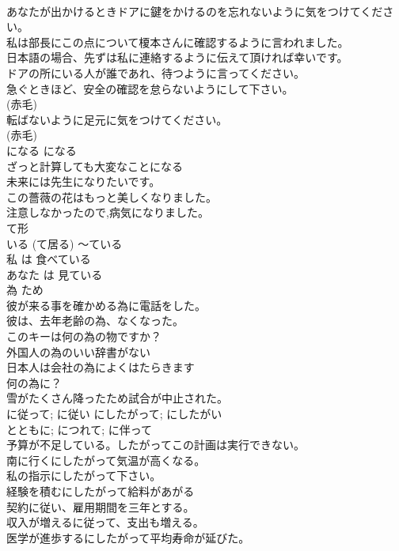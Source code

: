 \documentclass[8pt]{extreport}
\begin{document}
\begin{CJK}{UTF8}{min}
\\	あなたが出かけるときドアに鍵をかけるのを忘れないように気をつけてください。  
\\	私は部長にこの点について榎本さんに確認するように言われました。  
\\	日本語の場合、先ずは私に連絡するように伝えて頂ければ幸いです。  
\\	ドアの所にいる人が誰であれ、待つように言ってください。   
\\	急ぐときほど、安全の確認を怠らないようにして下さい。  
\\	(赤毛)
\\	転ばないように足元に気をつけてください。  
\\	(赤毛)
\\	になる	になる	
\\	ざっと計算しても大変なことになる 
\\	未来には先生になりたいです。  
\\	この薔薇の花はもっと美しくなりました。  
\\	注意しなかったので,病気になりました。  
\\	て形
\\	いる (て居る)	〜ている	
\\	私 は 食べている   
\\	あなた は 見ている   
\\	為	ため	
\\	彼が来る事を確かめる為に電話をした。  
\\	彼は、去年老齢の為、なくなった。  
\\	このキーは何の為の物ですか？  
\\	外国人の為のいい辞書がない  
\\	日本人は会社の為によくはたらきます  
\\	何の為に？  
\\	雪がたくさん降ったため試合が中止された。  
\\	に従って; に従い	にしたがって; にしたがい	
\\	とともに; につれて; に伴って	
\\	予算が不足している。したがってこの計画は実行できない。  
\\	南に行くにしたがって気温が高くなる。  
\\	私の指示にしたがって下さい。  
\\	経験を積むにしたがって給料があがる   
\\	契約に従い、雇用期間を三年とする。   
\\	収入が増えるに従って、支出も増える。  
\\	医学が進歩するにしたがって平均寿命が延びた。  

\end{CJK}
\end{document}

